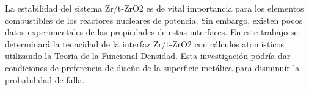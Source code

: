 La estabilidad del sistema Zr/t-ZrO2 es de vital importancia para los
elementos combustibles de los reactores nucleares de potencia. 
Sin embargo, existen pocos datos experimentales de las propiedades de estas interfaces.
En este trabajo se determinará la tenacidad de la interfaz Zr/t-ZrO2
con cálculos atomísticos utilizando la Teoría de la Funcional Densidad.
Esta investigación podría dar condiciones de preferencia de 
diseño de la superficie metálica para disminuir la probabilidad de falla.
